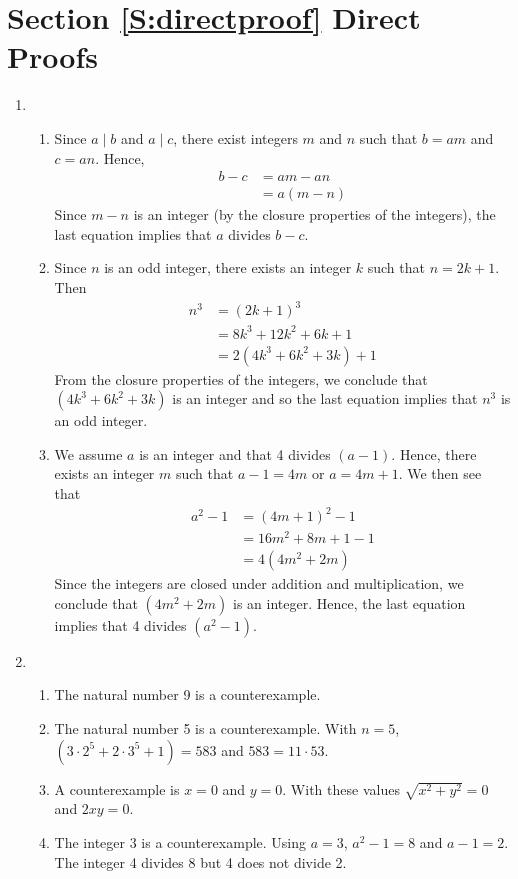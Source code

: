 \section*{Section \ref{S:directproof}  Direct Proofs}

\begin{enumerate}
\item  \begin{enumerate}
\item Since $a \mid b$ and $a \mid c$, there exist integers $m$ and $n$ such that $b = am$ and $c = an$.  Hence,
\begin{align*}
b - c &= am - an \\
      &= a(m - n)
\end{align*}
Since $m - n$ is an integer (by the closure properties of the integers), the last equation implies that $a$ divides $b - c$.

\item Since $n$ is an odd integer, there exists an integer $k$ such that $n = 2k + 1$.  Then
\begin{align*}
n^3 &= (2k + 1)^3 \\
    &= 8k^3 + 12k^2 + 6k + 1 \\
    &= 2\left( 4k^3 + 6k^2 + 3k \right) + 1
\end{align*}
From the closure properties of the integers, we conclude that $\left( 4k^3 + 6k^2 + 3k \right)$ is an integer and so the last equation implies that $n^3$ is an odd integer.

\item We assume $a$ is an integer and that 4 divides $(a - 1)$.  Hence, there exists an integer $m$ such that $a - 1 = 4m$ or $a = 4m + 1$.  We then see that
\begin{align*}
a^2 - 1 &= (4m + 1)^2 - 1 \\
        &= 16m^2 + 8m + 1 - 1 \\
        &= 4 \left( 4m^2 + 2m \right)
\end{align*}
Since the integers are closed under addition and multiplication, we conclude that  $\left( 4m^2 + 2m \right)$ is an integer.  Hence, the last equation implies that 4 divides $\left( a^2 - 1 \right)$.
\end{enumerate}


\item \begin{enumerate}
\item The natural number 9 is a counterexample.
\item The natural number 5 is a counterexample.  With $n = 5$, $\left( 3 \cdot 2^5 + 2 \cdot 3^5 + 1 \right) = 583$ and $583 = 11 \cdot 53$.
\item A counterexample is $x = 0$ and $y = 0$.  With these values $\sqrt{x^2 + y^2} = 0$ and $2xy = 0$.
\item The integer 3 is a counterexample.  Using $a = 3$, $a^2 - 1 = 8$ and $a - 1 = 2$.  The integer 4 divides 8 but 4 does not divide 2.
\end{enumerate}



\end{enumerate}
